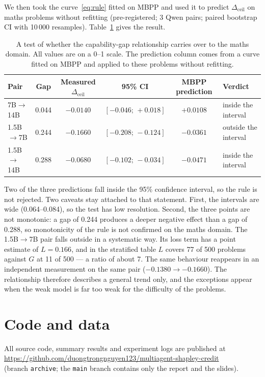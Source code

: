 \documentclass[11pt,a4paper]{article}
\newcommand{\dceil}{\Delta_{\mathrm{ceil}}}
\begin{document}
We then took the curve~\eqref{eq:rule} fitted on MBPP and used it to predict $\dceil$ on maths problems without refitting (pre-registered; 3 Qwen pairs; paired bootstrap CI with 10\,000 resamples). Table~\ref{tab:transfer} gives the result.

\begin{table}[htbp]
\centering
\small
\begin{tabular}{@{}l c c c c l@{}}
\toprule
Pair & Gap & Measured $\dceil$ & 95\% CI & MBPP prediction & Verdict\\
\midrule
7B$\to$14B & 0.044 & $-0.0140$ & $[-0.046;\,+0.018]$ & $+0.0108$ & inside the interval\\
1.5B$\to$7B & 0.244 & $-0.1660$ & $[-0.208;\,-0.124]$ & $-0.0361$ & outside the interval\\
1.5B$\to$14B & 0.288 & $-0.0680$ & $[-0.102;\,-0.034]$ & $-0.0471$ & inside the interval\\
\bottomrule
\end{tabular}
\caption{A test of whether the capability-gap relationship carries over to the maths domain. All values are on a 0--1 scale. The prediction column comes from a curve fitted on MBPP and applied to these problems without refitting.}
\label{tab:transfer}
\end{table}

Two of the three predictions fall inside the 95\% confidence interval, so the rule is not rejected. Two caveats stay attached to that statement. First, the intervals are wide (0.064--0.084), so the test has low resolution. Second, the three points are not monotonic: a gap of 0.244 produces a deeper negative effect than a gap of 0.288, so monotonicity of the rule is not confirmed on the maths domain. The 1.5B$\to$7B pair falls outside in a systematic way. Its loss term has a point estimate of $L = 0.166$, and in the stratified table $L$ covers 77 of 500 problems against $G$ at 11 of 500 --- a ratio of about 7. The same behaviour reappears in an independent measurement on the same pair ($-0.1380 \to -0.1660$). The relationship therefore describes a general trend only, and the exceptions appear when the weak model is far too weak for the difficulty of the problems.

\section{Code and data}
All source code, summary results and experiment logs are published at\\
\url{https://github.com/duongtrongnguyen123/multiagent-shapley-credit}\\
(branch \texttt{archive}; the \texttt{main} branch contains only the report and the slides).
\end{document}
